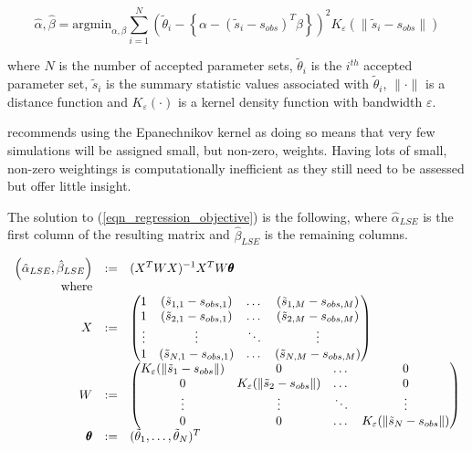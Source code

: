 \documentclass[11pt,a4paper]{article}
\theoremstyle{break}
\begin{document}
  \begin{equation}\label{eqn_regression_objective}
    \hat\alpha,\hat\beta=\text{argmin}_{\alpha,\beta}\sum_{i=1}^N\left(\tilde\theta_i-\left\{\alpha-(\tilde{s}_i-s_{obs})^T\beta\right\}\right)^2K_\varepsilon\left(\|\tilde{s}_i-s_{obs}\|\right)
  \end{equation}

  \noindent where $N$ is the number of accepted parameter sets, $\tilde\theta_i$ is the $i^{th}$ accepted parameter set, $\tilde{s}_i$ is the summary statistic values associated with $\tilde\theta_i$, $\|\cdot\|$ is a distance function and $K_\varepsilon(\cdot)$ is a kernel density function with bandwidth $\varepsilon$.

  \par \cite[]{ABC_in_population_genetics} recommends using the Epanechnikov kernel as doing so means that very few simulations will be assigned small, but non-zero, weights. Having lots of small, non-zero weightings is computationally inefficient as they still need to be assessed but offer little insight.

  \noindent The solution to (\ref{eqn_regression_objective}) is the following, where $\hat\alpha_{LSE}$ is the first column of the resulting matrix and $\hat\beta_{LSE}$ is the remaining columns.

  \[\everymath={\displaystyle}\begin{array}{rrl}
    \left(\hat\alpha_{LSE},\hat\beta_{LSE}\right)&:=&(X^TWX)^{-1}X^TW\pmb\theta\\
    \text{where}\\
    X&:=&\begin{pmatrix}
      1&(\tilde{s}_{1,1}-s_{obs,1})&\dots&(\tilde{s}_{1,M}-s_{obs,M})\\
      1&(\tilde{s}_{2,1}-s_{obs,1})&\dots&(\tilde{s}_{2,M}-s_{obs,M})\\
      \vdots&\vdots&\ddots&\vdots\\
      1&(\tilde{s}_{N,1}-s_{obs,1})&\dots&(\tilde{s}_{N,M}-s_{obs,M})
    \end{pmatrix}\\
    W&:=&\begin{pmatrix}
      K_{\varepsilon}(\|\tilde{s}_1-s_{obs}\|)&0&\dots&0\\
      0&K_{\varepsilon}(\|\tilde{s}_2-s_{obs}\|)&\dots&0\\
      \vdots&\vdots&\ddots&\vdots\\
      0&0&\dots&K_{\varepsilon}(\|\tilde{s}_N-s_{obs}\|)
    \end{pmatrix}\\
    \pmb\theta&:=&(\tilde\theta_1,\dots,\tilde\theta_N)^T
  \end{array}\]
\end{document}
